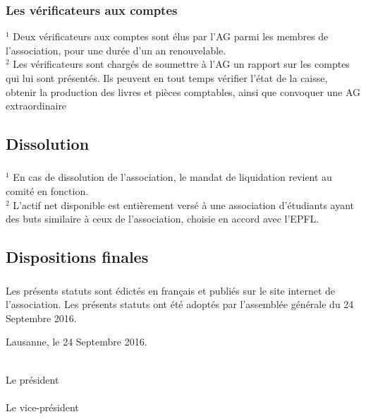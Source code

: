 \documentclass[12pt,a4paper,oneside]{article}
\newcounter{art}
\newcommand{\french}{    \switchcolumn[1]\noindent}
\newcounter{para}
\begin{document}
\begin{paracol}{2}
\french
	\subsubsection{Les vérificateurs aux comptes}
	$^1$ Deux vérificateurs aux comptes sont élus par l’AG parmi les membres de l’association, pour une durée d’un an renouvelable.\\
	$^2$ Les vérificateurs sont chargés de soumettre à l’AG un rapport sur les comptes qui lui sont présentés. Ils peuvent en tout temps vérifier l’état de la caisse, obtenir la production des livres et pièces comptables, ainsi que convoquer une AG extraordinaire


\french
	\subsection{Dissolution}

	\subsubsection{}
	$^1$ En cas de dissolution de l’association, le mandat de liquidation revient au comité en fonction. \\
	$^2$ L'actif net disponible est entièrement versé à une association d’étudiants ayant des buts similaire à ceux de l’association, choisie en accord avec l’EPFL.


\french
	\subsection{Dispositions finales}

	\subsubsection{}
	Les présents statuts sont édictés en français et publiés sur le site internet de l’association. Les présents statuts ont été adoptés par l’assemblée générale du 24 Septembre 2016.


 	\vspace{\fill}

	\noindent
	Lausanne, le 24 Septembre 2016.
	\vspace {1.5cm}

	\noindent
	\hrulefill \\
 	Le président \\

	\vspace {1.0cm}
 	\noindent 
 	\hrulefill \\
 	Le vice-président\\


\clearpage

% 



\end{paracol}
\end{document}
